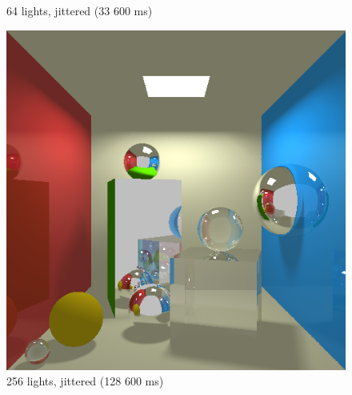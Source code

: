 \begin{figure}[H]
    \caption{64 lights, jittered (33 600 ms)}
\endminipage\hfill
{}
    \centering
    \includegraphics[width=\linewidth]{img/shadows/256_jittered.png}
    \caption{256 lights, jittered (128 600 ms)}
\endminipage\hfill
\end{figure}

